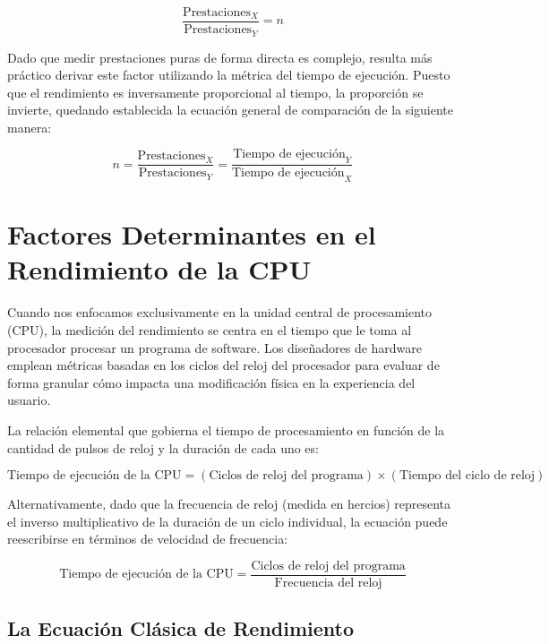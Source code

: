 \documentclass[12pt,a4paper]{article}
\begin{document}
	\begin{equation}
		\frac{\text{Prestaciones}_X}{\text{Prestaciones}_Y} = n
	\end{equation}
	
	Dado que medir prestaciones puras de forma directa es complejo, resulta más práctico derivar este factor utilizando la métrica del tiempo de ejecución. Puesto que el rendimiento es inversamente proporcional al tiempo, la proporción se invierte, quedando establecida la ecuación general de comparación de la siguiente manera:
	
	\begin{equation}
		n = \frac{\text{Prestaciones}_X}{\text{Prestaciones}_Y} = \frac{\text{Tiempo de ejecución}_Y}{\text{Tiempo de ejecución}_X}
	\end{equation}
	
	\section{Factores Determinantes en el Rendimiento de la CPU}
	
	Cuando nos enfocamos exclusivamente en la unidad central de procesamiento (CPU), la medición del rendimiento se centra en el tiempo que le toma al procesador procesar un programa de software. Los diseñadores de hardware emplean métricas basadas en los ciclos del reloj del procesador para evaluar de forma granular cómo impacta una modificación física en la experiencia del usuario. 
	
	La relación elemental que gobierna el tiempo de procesamiento en función de la cantidad de pulsos de reloj y la duración de cada uno es:
	
	\begin{equation}
	\text{Tiempo de ejecución de la CPU} = (\text{Ciclos de reloj del programa}) \times (\text{Tiempo del ciclo de reloj})
\end{equation}
	
	Alternativamente, dado que la frecuencia de reloj (medida en hercios) representa el inverso multiplicativo de la duración de un ciclo individual, la ecuación puede reescribirse en términos de velocidad de frecuencia:
	
	\begin{equation}
		\text{Tiempo de ejecución de la CPU} = \frac{\text{Ciclos de reloj del programa}}{\text{Frecuencia del reloj}}
	\end{equation}

    \clearpage
	
	\subsection{La Ecuación Clásica de Rendimiento}
	
\end{document}
